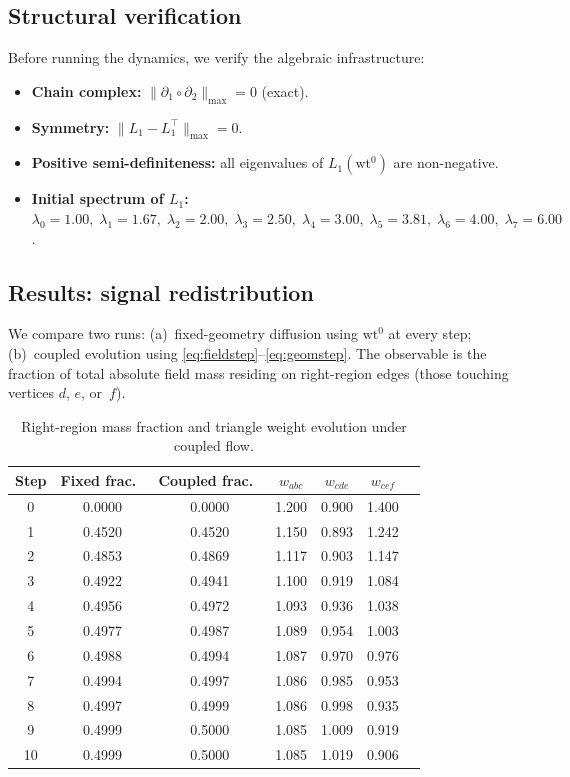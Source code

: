 \documentclass[11pt]{article}
\newcommand{\wt}{\mathrm{wt}}
\begin{document}
\subsection{Structural verification}

Before running the dynamics, we verify the algebraic infrastructure:
\begin{itemize}
  \item \textbf{Chain complex:} $\|\partial_1\circ\partial_2\|_{\max}=0$ (exact).
  \item \textbf{Symmetry:} $\|L_1-L_1^\top\|_{\max}=0$.
  \item \textbf{Positive semi-definiteness:} all eigenvalues of $L_1(\wt^0)$ are non-negative.
  \item \textbf{Initial spectrum of $L_1$:}
    $\lambda_0=1.00,\; \lambda_1=1.67,\; \lambda_2=2.00,\; \lambda_3=2.50,\;
     \lambda_4=3.00,\; \lambda_5=3.81,\; \lambda_6=4.00,\; \lambda_7=6.00$.
\end{itemize}

\subsection{Results: signal redistribution}

We compare two runs: (a)~fixed-geometry diffusion using $\wt^0$ at every step; (b)~coupled evolution using \eqref{eq:fieldstep}--\eqref{eq:geomstep}.  The observable is the fraction of total absolute field mass residing on right-region edges (those touching vertices $d$, $e$, or~$f$).

\begin{table}[ht]
\centering
\small
\caption{Right-region mass fraction and triangle weight evolution under coupled flow.}
\label{tab:trajectory}
\begin{tabular}{ccccccc}
\toprule
Step & Fixed frac.\ & Coupled frac.\ & $w_{abc}$ & $w_{cde}$ & $w_{cef}$ \\
\midrule
 0 & 0.0000 & 0.0000 & 1.200 & 0.900 & 1.400 \\
 1 & 0.4520 & 0.4520 & 1.150 & 0.893 & 1.242 \\
 2 & 0.4853 & 0.4869 & 1.117 & 0.903 & 1.147 \\
 3 & 0.4922 & 0.4941 & 1.100 & 0.919 & 1.084 \\
 4 & 0.4956 & 0.4972 & 1.093 & 0.936 & 1.038 \\
 5 & 0.4977 & 0.4987 & 1.089 & 0.954 & 1.003 \\
 6 & 0.4988 & 0.4994 & 1.087 & 0.970 & 0.976 \\
 7 & 0.4994 & 0.4997 & 1.086 & 0.985 & 0.953 \\
 8 & 0.4997 & 0.4999 & 1.086 & 0.998 & 0.935 \\
 9 & 0.4999 & 0.5000 & 1.085 & 1.009 & 0.919 \\
10 & 0.4999 & 0.5000 & 1.085 & 1.019 & 0.906 \\
\bottomrule
\end{tabular}
\end{table}
\end{document}
